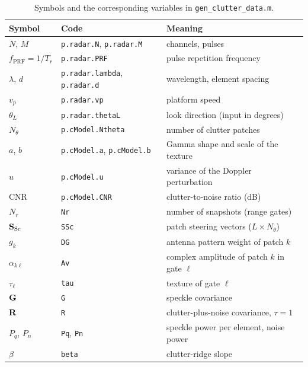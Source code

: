 \documentclass{article}
\begin{document}
\begin{table}[ht]
  \centering\small
  \caption{Symbols and the corresponding variables in \texttt{gen\_clutter\_data.m}.}
  \label{tab:code:symbols}
  \begin{tabular}{@{}lll@{}}
    \toprule
    Symbol & Code & Meaning \\
    \midrule
    $N$, $M$               & \texttt{p.radar.N}, \texttt{p.radar.M}           & channels, pulses \\
    $f_\mathrm{PRF}=1/T_r$ & \texttt{p.radar.PRF}                             & pulse repetition frequency \\
    $\lambda$, $d$         & \texttt{p.radar.lambda}, \texttt{p.radar.d}      & wavelength, element spacing \\
    $v_p$                  & \texttt{p.radar.vp}                              & platform speed \\
    $\theta_L$             & \texttt{p.radar.thetaL}                          & look direction (input in degrees) \\
    $N_\theta$             & \texttt{p.cModel.Ntheta}                         & number of clutter patches \\
    $a$, $b$               & \texttt{p.cModel.a}, \texttt{p.cModel.b}         & Gamma shape and scale of the texture \\
    $u$                    & \texttt{p.cModel.u}                              & variance of the Doppler perturbation \\
    CNR                    & \texttt{p.cModel.CNR}                            & clutter-to-noise ratio (dB) \\
    $N_r$                  & \texttt{Nr}                                      & number of snapshots (range gates) \\
    $\mathbf{S}_\mathrm{Sc}$     & \texttt{SSc}                                     & patch steering vectors ($L\times N_\theta$) \\
    $g_k$                  & \texttt{DG}                                      & antenna pattern weight of patch $k$ \\
    $\alpha_{k\ell}$       & \texttt{Av}                                      & complex amplitude of patch $k$ in gate $\ell$ \\
    $\tau_\ell$            & \texttt{tau}                                     & texture of gate $\ell$ \\
    $\mathbf{G}$                 & \texttt{G}                                       & speckle covariance \\
    $\mathbf{R}$                 & \texttt{R}                                       & clutter-plus-noise covariance, $\tau=1$ \\
    $P_q$, $P_n$           & \texttt{Pq}, \texttt{Pn}                         & speckle power per element, noise power \\
    $\beta$                & \texttt{beta}                                    & clutter-ridge slope \\
    \bottomrule
  \end{tabular}
\end{table}
\end{document}
